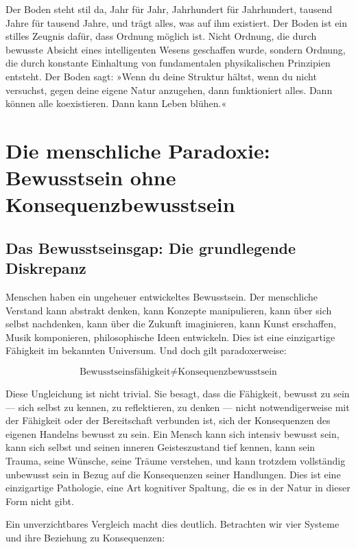 \documentclass[12pt,a4paper]{article}
\begin{document}
Der Boden steht stil da, Jahr für Jahr, Jahrhundert für Jahrhundert, tausend Jahre für tausend Jahre, und trägt alles, was auf ihm existiert. Der Boden ist ein stilles Zeugnis dafür, dass Ordnung möglich ist. Nicht Ordnung, die durch bewusste Absicht eines intelligenten Wesens geschaffen wurde, sondern Ordnung, die durch konstante Einhaltung von fundamentalen physikalischen Prinzipien entsteht. Der Boden sagt: »Wenn du deine Struktur hältst, wenn du nicht versuchst, gegen deine eigene Natur anzugehen, dann funktioniert alles. Dann können alle koexistieren. Dann kann Leben blühen.«

\section{Die menschliche Paradoxie: Bewusstsein ohne Konsequenzbewusstsein}

\subsection{Das Bewusstseinsgap: Die grundlegende Diskrepanz}

Menschen haben ein ungeheuer entwickeltes Bewusstsein. Der menschliche Verstand kann abstrakt denken, kann Konzepte manipulieren, kann über sich selbst nachdenken, kann über die Zukunft imaginieren, kann Kunst erschaffen, Musik komponieren, philosophische Ideen entwickeln. Dies ist eine einzigartige Fähigkeit im bekannten Universum. Und doch gilt paradoxerweise:

\begin{equation}
\text{Bewusstseinsfähigkeit} \neq \text{Konsequenzbewusstsein}
\end{equation}

Diese Ungleichung ist nicht trivial. Sie besagt, dass die Fähigkeit, bewusst zu sein — sich selbst zu kennen, zu reflektieren, zu denken — nicht notwendigerweise mit der Fähigkeit oder der Bereitschaft verbunden ist, sich der Konsequenzen des eigenen Handelns bewusst zu sein. Ein Mensch kann sich intensiv bewusst sein, kann sich selbst und seinen inneren Geisteszustand tief kennen, kann sein Trauma, seine Wünsche, seine Träume verstehen, und kann trotzdem vollständig unbewusst sein in Bezug auf die Konsequenzen seiner Handlungen. Dies ist eine einzigartige Pathologie, eine Art kognitiver Spaltung, die es in der Natur in dieser Form nicht gibt.

Ein unverzichtbares Vergleich macht dies deutlich. Betrachten wir vier Systeme und ihre Beziehung zu Konsequenzen:
\end{document}
